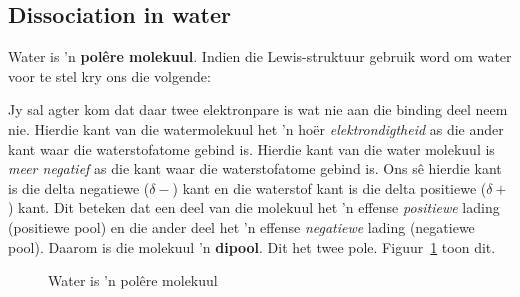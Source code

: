             \subsection*{Dissociation in water}
            \nopagebreak
        \label{m38720*id335324}Water is 'n \textbf{pol\^{e}re molekuul}. Indien die Lewis-struktuur gebruik word om water voor te stel kry ons die volgende:
\begin{figure}[H]
\begin{center}
\end{center}
\end{figure}
Jy sal agter kom dat daar twee elektronpare is wat nie aan die binding deel neem nie. Hierdie kant van die watermolekuul het 'n ho\"{e}r \textsl{elektrondigtheid} as die ander kant waar die waterstofatome gebind is. Hierdie kant van die water molekuul is \textsl{meer negatief} as die kant waar die waterstofatome gebind is. Ons s\^{e} hierdie kant is die delta negatiewe ($\delta -$) kant en die waterstof kant is die delta positiewe ($\delta +$) kant. Dit beteken dat een deel van die molekuul het 'n effense \textsl{positiewe} lading (positiewe pool) en die ander deel het 'n effense \textsl{negatiewe} lading (negatiewe pool). Daarom is die molekuul 'n \textbf{dipool}. Dit het twee pole. Figuur~\ref{fig:hydrosphere:water} toon dit.\par 
    \setcounter{subfigure}{0}
\begin{figure}[H]
\begin{center}
\end{center}
\caption{Water is 'n pol\^{e}re molekuul}
\label{fig:hydrosphere:water}
\end{figure}
